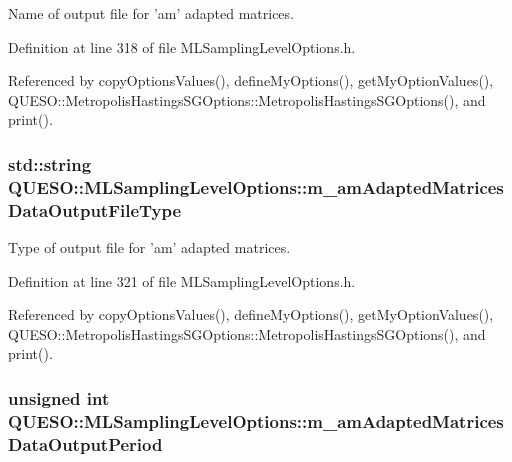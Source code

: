 Name of output file for 'am' adapted matrices. 



Definition at line 318 of file M\-L\-Sampling\-Level\-Options.\-h.



Referenced by copy\-Options\-Values(), define\-My\-Options(), get\-My\-Option\-Values(), Q\-U\-E\-S\-O\-::\-Metropolis\-Hastings\-S\-G\-Options\-::\-Metropolis\-Hastings\-S\-G\-Options(), and print().

\hypertarget{class_q_u_e_s_o_1_1_m_l_sampling_level_options_ab209a7f5dac6c2b4e108a7a1829631c6}{
\subsubsection[{m\-\_\-am\-Adapted\-Matrices\-Data\-Output\-File\-Type}]{\setlength{\rightskip}{0pt plus 5cm}std\-::string Q\-U\-E\-S\-O\-::\-M\-L\-Sampling\-Level\-Options\-::m\-\_\-am\-Adapted\-Matrices\-Data\-Output\-File\-Type}}\label{class_q_u_e_s_o_1_1_m_l_sampling_level_options_ab209a7f5dac6c2b4e108a7a1829631c6}


Type of output file for 'am' adapted matrices. 



Definition at line 321 of file M\-L\-Sampling\-Level\-Options.\-h.



Referenced by copy\-Options\-Values(), define\-My\-Options(), get\-My\-Option\-Values(), Q\-U\-E\-S\-O\-::\-Metropolis\-Hastings\-S\-G\-Options\-::\-Metropolis\-Hastings\-S\-G\-Options(), and print().

\hypertarget{class_q_u_e_s_o_1_1_m_l_sampling_level_options_a8c7ce073c75774afdbffa1ba3674085c}{
\subsubsection[{m\-\_\-am\-Adapted\-Matrices\-Data\-Output\-Period}]{\setlength{\rightskip}{0pt plus 5cm}unsigned int Q\-U\-E\-S\-O\-::\-M\-L\-Sampling\-Level\-Options\-::m\-\_\-am\-Adapted\-Matrices\-Data\-Output\-Period}}\label{class_q_u_e_s_o_1_1_m_l_sampling_level_options_a8c7ce073c75774afdbffa1ba3674085c}


